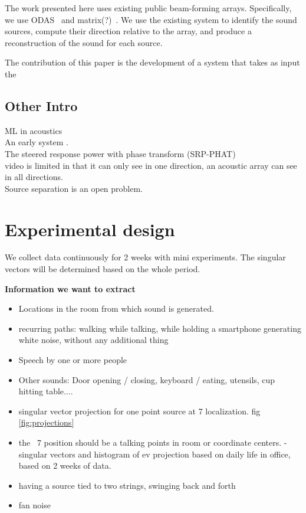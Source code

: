 \documentclass[journal]{IEEEtran}
\begin{document}
The work presented here uses existing public beam-forming arrays. Specifically, we use ODAS~\cite{grondin2019lightweight} and matrix(?)~\cite{}. We use the existing system to identify the sound sources, compute their direction relative to the array, and produce a reconstruction of the sound for each source.

The contribution of this paper is the development of a system that takes as input the 

\subsection{Other Intro}
ML in acoustics\cite{Bianco2019}\\
An early system \cite{Ettinger2008}.\\
The steered response power  with  phase  transform  (SRP-PHAT)  \cite{brandstein1997robust}\\
video is limited in that it can only see in one direction, an acoustic array can see in all directions.\\
Source separation is an open problem.

\section{Experimental design}
We collect data continuously for 2 weeks with mini experiments. The singular vectors will be determined based on the whole period.

{\bf Information we want to extract}
\begin{itemize}
\item Locations in the room from which sound is generated.
\item recurring paths: walking while talking, while holding a smartphone generating white noise, without any additional thing
\item Speech by one or more people
\item Other sounds: Door opening / closing, keyboard / eating, utensils, cup hitting table....
\item singular vector projection for one point source at 7 localization. fig \ref{fig:projections}
\item the ~7 position should be a talking points in room or coordinate centers.
- singular vectors and histogram of ev projection based on daily life in office, based on 2 weeks of data. 
\item having a source tied to two strings, swinging back and forth
\item fan noise
\end{itemize}
\end{document}
